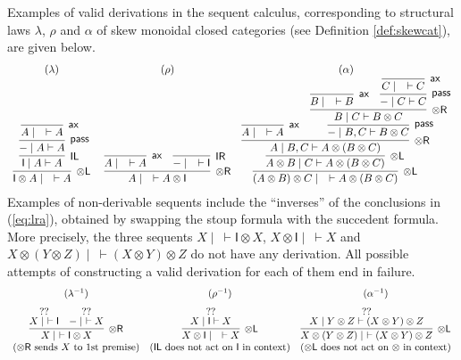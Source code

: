 \documentclass[copyright,creativecommons]{eptcs}
\theoremstyle{definition}
\newcommand{\tl}{\otimes \mathsf{L}}
\newcommand{\tr}{\otimes \mathsf{R}}
\newcommand{\pass}{\mathsf{pass}}
\newcommand{\unitl}{\mathsf{IL}}
\newcommand{\unitr}{\mathsf{IR}}
\newcommand{\ax}{\mathsf{ax}}
\newcommand{\ot}{\otimes}
\newcommand{\I}{\mathsf{I}}
\begin{document}
Examples of valid derivations in the sequent calculus, corresponding to structural laws $\lambda$, $\rho$ and $\alpha$ of skew monoidal closed categories (see Definition \ref{def:skewcat}), are given below. %
\begin{equation}\label{eq:lra}
  \begin{array}{c@{\;\quad}cc}
  (\lambda) & (\rho) & (\alpha) \\
  \infer[\tl]{\I \ot A \mid \quad \vdash A}{
    \infer[\unitl]{\I \mid A \vdash A}{
      \infer[\pass]{{-} \mid A \vdash A}{
        \infer[\ax]{A \mid \quad \vdash A}{}
      }
    }
  }
  &
  \infer[\tr]{A \mid \quad \vdash A \ot \I}{
    \infer[\ax]{A \mid \quad \vdash A}{}
    &
    \infer[\unitr]{{-} \mid \quad \vdash \I}{}
  }
  &
  \infer[\tl]{(A \ot B) \ot C \mid \quad \vdash A \ot (B \ot C)}{
    \infer[\tl]{A \ot B \mid C \vdash A \ot (B \ot C)}{
      \infer[\tr]{A \mid B , C \vdash A \ot (B \ot C)}{
        \infer[\ax]{A \mid \quad \vdash A}{}
        &
        \infer[\pass]{{-} \mid B , C \vdash B \ot C}{
          \infer[\tr]{B \mid C \vdash B \ot C}{
            \infer[\ax]{B \mid \quad \vdash B}{}
            &
            \infer[\pass]{{-} \mid C \vdash C}{
              \infer[\ax]{C \mid \quad \vdash C}{}
            }
          }
        }
      }
    }
  }
  \end{array}
\end{equation}
Examples of non-derivable sequents include the ``inverses'' of the conclusions in (\ref{eq:lra}), obtained by swapping the stoup formula with the succedent formula.
More precisely, the three sequents $X \mid ~ \vdash \I \ot X$, $X \ot \I \mid ~ \vdash X$ and $X \ot (Y \ot Z) \mid ~ \vdash (X \ot Y) \ot Z$ do not have any derivation. All possible attempts of constructing a valid derivation for each of them end in failure.
\begin{displaymath}
  \begin{array}{ccc}
  (\lambda^{-1}) & (\rho^{-1}) & (\alpha^{-1}) \\[6pt]
    \infer[\tr]{X \mid ~\vdash \I \ot X}{
      \deduce[??]{X \mid ~ \vdash \I}{
      }
      &
      \deduce[??]{{-} \mid ~ \vdash X}{
      }
    }
    &
    \infer[\tl]{X \ot \I \mid \quad \vdash X}{
      \deduce{X \mid \I \vdash X}{??}
    }
    &
    \infer[\tl]{X \ot (Y \ot Z) \mid ~\vdash (X \ot Y) \ot Z}{
      \deduce{X \mid Y \ot Z \vdash (X \ot Y) \ot Z}{??}
    } \\
    (\text{$\tr$ sends $X$ to 1st premise}) &
    (\text{$\unitl$ does not act on $\I$ in context}) &
    (\text{$\tl$ does not act on $\ot$ in context})
  \end{array}
\end{displaymath}
\end{document}
